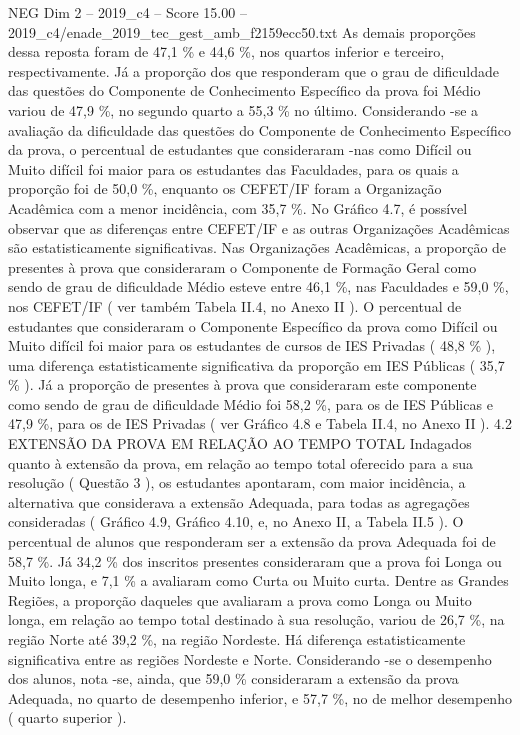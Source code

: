 \begin{textsample}{NEG Dim 2 – 2019\_c4 – Score 15.00 – 2019\_c4/enade\_2019\_tec\_gest\_amb\_f2159ecc50.txt}
As demais proporções dessa reposta foram de 47,1 \% e 44,6 \%, nos quartos inferior e terceiro, respectivamente.
Já a proporção dos que responderam que o grau de dificuldade das questões do Componente de Conhecimento Específico da prova foi Médio variou de 47,9 \%, no segundo quarto a 55,3 \% no último.
Considerando -se a avaliação da dificuldade das questões do Componente de Conhecimento Específico da prova, o percentual de estudantes que consideraram -nas como Difícil ou Muito difícil foi maior para os estudantes das Faculdades, para os quais a proporção foi de 50,0 \%, enquanto os CEFET/IF foram a Organização Acadêmica com a menor incidência, com 35,7 \%.
No Gráfico 4.7, é possível observar que as diferenças entre CEFET/IF e as outras Organizações Acadêmicas são estatisticamente significativas.
Nas Organizações Acadêmicas, a proporção de presentes à prova que consideraram o Componente de Formação Geral como sendo de grau de dificuldade Médio esteve entre 46,1 \%, nas Faculdades e 59,0 \%, nos CEFET/IF ( ver também Tabela II.4, no Anexo II ).
O percentual de estudantes que consideraram o Componente Específico da prova como Difícil ou Muito difícil foi maior para os estudantes de cursos de IES Privadas ( 48,8 \% ), uma diferença estatisticamente significativa da proporção em IES Públicas ( 35,7 \% ).
Já a proporção de presentes à prova que consideraram este componente como sendo de grau de dificuldade Médio foi 58,2 \%, para os de IES Públicas e 47,9 \%, para os de IES Privadas ( ver Gráfico 4.8 e Tabela II.4, no Anexo II ). 4.2 EXTENSÃO DA PROVA EM RELAÇÃO AO TEMPO TOTAL Indagados quanto à extensão da prova, em relação ao tempo total oferecido para a sua resolução ( Questão 3 ), os estudantes apontaram, com maior incidência, a alternativa que considerava a extensão Adequada, para todas as agregações consideradas ( Gráfico 4.9, Gráfico 4.10, e, no Anexo II, a Tabela II.5 ).
O percentual de alunos que responderam ser a extensão da prova Adequada foi de 58,7 \%.
Já 34,2 \% dos inscritos presentes consideraram que a prova foi Longa ou Muito longa, e 7,1 \% a avaliaram como Curta ou Muito curta.
Dentre as Grandes Regiões, a proporção daqueles que avaliaram a prova como Longa ou Muito longa, em relação ao tempo total destinado à sua resolução, variou de 26,7 \%, na região Norte até 39,2 \%, na região Nordeste.
Há diferença estatisticamente significativa entre as regiões Nordeste e Norte.
Considerando -se o desempenho dos alunos, nota -se, ainda, que 59,0 \% consideraram a extensão da prova Adequada, no quarto de desempenho inferior, e 57,7 \%, no de melhor desempenho ( quarto superior ).

\end{textsample}
